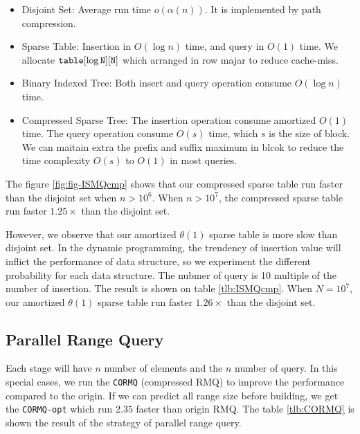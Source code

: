 \begin{itemize}
  \item 

Disjoint Set: Average run time $o(\alpha(n))$.  It is implemented by
path compression.

  \item 

Sparse Table: Insertion in $O(\log n)$ time, and query in $O(1)$ time.
We allocate $\tt{table}[\log N][N]$ which arranged in row majar to
reduce cache-miss.

  \item 

Binary Indexed Tree: Both insert and query operation consume $O(\log
n)$ time.

  \item 

Compressed Sparse Tree: The insertion operation consume amortized
$O(1)$ time.  The query operation consume $O(s)$ time, which $s$ is
the size of block.  We can maitain extra the prefix and suffix maximum
in blcok to reduce the time complexity $O(s)$ to $O(1)$ in most
queries.

\end{itemize}

The figure \ref{fig:fig-ISMQcmp} shows that our compressed sparse
table run faster than the disjoint set when $n > 10^6$.  When $n >
10^7$, the compressed sparse table run faster $1.25 \times$ than the
disjoint set.  

\begin{figure*}[!thb]
  \centering
  
  \caption{ISMQ runs on E5-2620 with different data structures. We use the random test cases without any limitation, e.g. the length of interval query has a uniform distribution.}
  \label{fig:fig-ISMQcmp}
\end{figure*}

However, we observe that our amortized $\theta(1)$ sparse table is more
slow than  disjoint set.  In the dynamic programming, the trendency of insertion value will inflict the performance of data structure, so we experiment the different probability for each data structure.  The nubmer of query is 10 multiple of the number of insertion.  The result is shown on table \ref{tlb:ISMQcmp}.  When $N=10^7$, our amortized $\theta(1)$ sparse table run faster $1.26 \times$ than the disjoint set.



\subsection{Parallel Range Query}

Each stage will have $n$ number of elements and the $n$ number of query.  In this special cases, we run the \texttt{CORMQ} (compressed RMQ) to improve the performance compared to the origin.  If we can predict all range size before building, we get the \texttt{CORMQ-opt} which run $2.35$ faster than origin RMQ.  The table \ref{tlb:CORMQ} is shown the result of the strategy of parallel range query.

